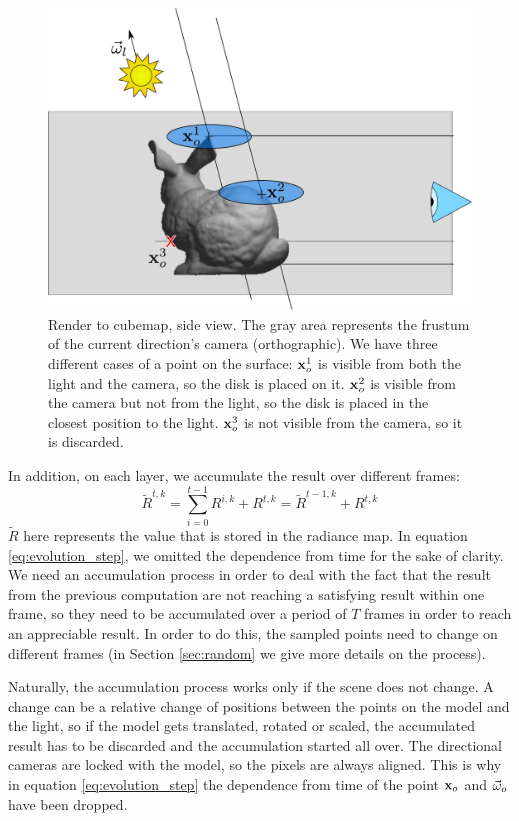 \begin{figure}[!ht]
\centering
\includegraphics[width=\linewidth]{images/method/step2}
\caption{Render to cubemap, side view. The gray area represents the frustum of the current direction's camera (orthographic). We have three different cases of a point on the surface: $\mathbf{x}_o^1$ is visible from both the light and the camera, so the disk is placed on it. $\mathbf{x}_o^2$ is visible from the camera but not from the light, so the disk is placed in the closest position to the light. $\mathbf{x}_o^3$ is not visible from the camera, so it is discarded.}
\label{fig:stepfrustum}
\end{figure} 

In addition, on each layer, we accumulate the result over different frames:
$$
\tilde{R}^{t,k} = \sum_{i = 0}^{t-1} R^{i,k} + R^{t,k} = \tilde{R}^{t-1, k} + R^{t,k}
$$
$\tilde{R}$ here represents the value that is stored in the radiance map. In equation \ref{eq:evolution_step}, we omitted the dependence from time for the sake of clarity. We need an accumulation process in order to deal with the fact that the result from the previous computation are not reaching a satisfying result within one frame, so they need to be accumulated over a period of $T$ frames in order to reach an appreciable result. In order to do this, the sampled points need to change on different frames (in Section \ref{sec:random} we give more details on the process). 

Naturally, the accumulation process works only if the scene does not change. A change can be a relative change of positions between the points on the model and the light, so if the model gets translated, rotated or scaled, the accumulated result has to be discarded and the accumulation started all over. The directional cameras are locked with the model, so the pixels are always aligned. This is why in equation \ref{eq:evolution_step} the dependence from time of the point $\mathbf{x}_o$ and $\vec{\omega}_o$ have been dropped. 
 
